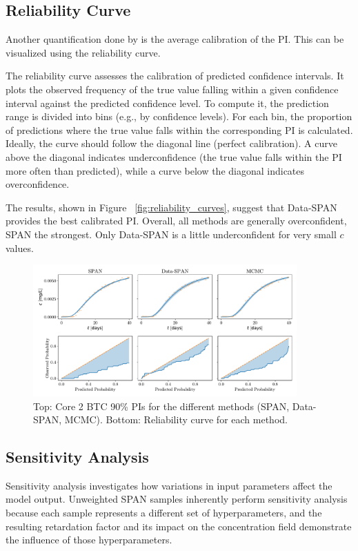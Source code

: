 \subsection{Reliability Curve}
Another quantification done by \cite{finn} is the average calibration of the PI. This can be visualized using the reliability curve.

The reliability curve assesses the calibration of predicted confidence intervals. It plots the observed frequency of the true value falling within a given confidence interval against the predicted confidence level. To compute it, the prediction range is divided into bins (e.g., by confidence levels). For each bin, the proportion of predictions where the true value falls within the corresponding PI is calculated. Ideally, the curve should follow the diagonal line (perfect calibration). A curve above the diagonal indicates underconfidence (the true value falls within the PI more often than predicted), while a curve below the diagonal indicates overconfidence.

The results, shown in Figure ~\vref{fig:reliability_curves}, suggest that Data-SPAN provides the best calibrated PI. Overall, all methods are generally overconfident, SPAN the strongest. Only Data-SPAN is a little underconfident for very small $c$ values.

\begin{figure}
    \centering
    \includegraphics[width=0.9\textwidth]{figs/reliability_curves.pdf}
    \caption{Top: Core 2 BTC 90\% PIs for the different methods (SPAN, Data-SPAN, MCMC). Bottom: Reliability curve for each method.}
    \label{fig:reliability_curves}
\end{figure}


\subsection{Sensitivity Analysis}
\label{sec:sensitivity}
Sensitivity analysis investigates how variations in input parameters affect the model output. Unweighted SPAN samples inherently perform sensitivity analysis because each sample represents a different set of hyperparameters, and the resulting retardation factor and its impact on the concentration field demonstrate the influence of those hyperparameters.

